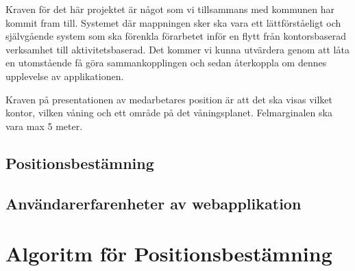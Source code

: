 \documentclass[swedish, a4paper,12pt]{article}
\begin{document}
%
%
%
%
%
Kraven för det här projektet är något som vi tillsammans med kommunen har kommit fram till. Systemet där mappningen sker ska vara ett lättförståeligt och självgående system som ska förenkla förarbetet inför en flytt från kontorsbaserad verksamhet till aktivitetsbaserad. Det kommer vi kunna utvärdera genom att låta en utomstående få göra sammankopplingen och sedan återkoppla om dennes upplevelse av applikationen.

Kraven på presentationen av medarbetares position är att det ska visas vilket kontor, vilken våning och ett område på det våningsplanet. Felmarginalen ska vara max 5 meter.

\subsection{Positionsbestämning}

\subsection{Användarerfarenheter av webapplikation}




\section{Algoritm för Positionsbestämning}
\end{document}
